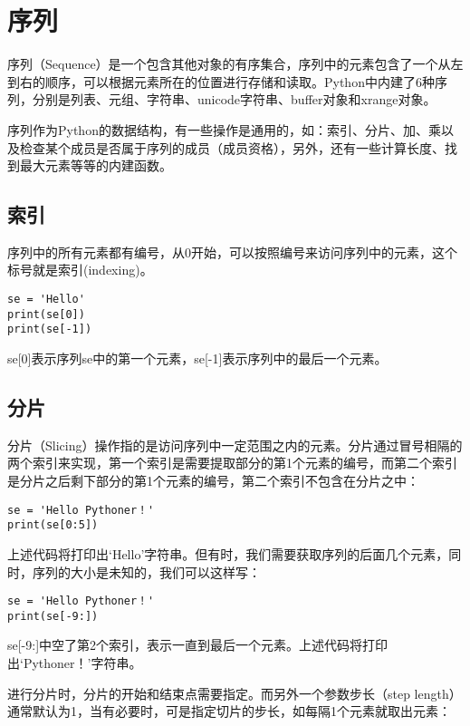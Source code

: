\section{序列}

序列（Sequence）是一个包含其他对象的有序集合，序列中的元素包含了一个从左到右的顺序，可以根据元素所在的位置进行存储和读取。Python中内建了6种序列，分别是列表、元组、字符串、unicode字符串、buffer对象和xrange对象。

序列作为Python的数据结构，有一些操作是通用的，如：索引、分片、加、乘以及检查某个成员是否属于序列的成员（成员资格），另外，还有一些计算长度、找到最大元素等等的内建函数。

\subsection{索引}

序列中的所有元素都有编号，从0开始，可以按照编号来访问序列中的元素，这个标号就是索引(indexing)。

\begin{lstlisting}
se = 'Hello'
print(se[0])
print(se[-1])
\end{lstlisting}

se[0]表示序列se中的第一个元素，se[-1]表示序列中的最后一个元素。

\subsection{分片}

分片（Slicing）操作指的是访问序列中一定范围之内的元素。分片通过冒号相隔的两个索引来实现，第一个索引是需要提取部分的第1个元素的编号，而第二个索引是分片之后剩下部分的第1个元素的编号，第二个索引不包含在分片之中：

\begin{lstlisting}
se = 'Hello Pythoner！'
print(se[0:5])
\end{lstlisting}

上述代码将打印出‘Hello’字符串。但有时，我们需要获取序列的后面几个元素，同时，序列的大小是未知的，我们可以这样写：

\begin{lstlisting}
se = 'Hello Pythoner！'
print(se[-9:])
\end{lstlisting}

se[-9:]中空了第2个索引，表示一直到最后一个元素。上述代码将打印出‘Pythoner！’字符串。

进行分片时，分片的开始和结束点需要指定。而另外一个参数步长（step length）通常默认为1，当有必要时，可是指定切片的步长，如每隔1个元素就取出元素：

